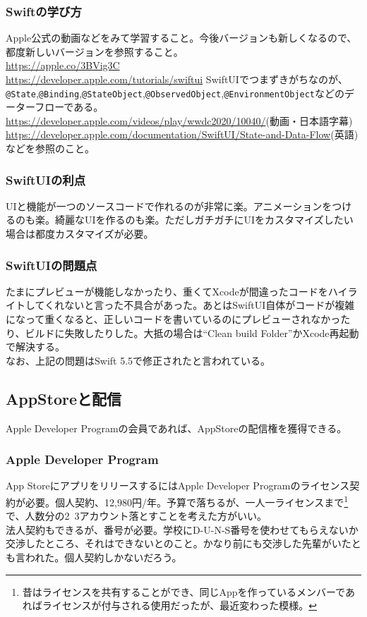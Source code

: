 \documentclass[dvipdfmx,jb5]{jreport}
\begin{document}
\subsubsection{Swiftの学び方}
Apple公式の動画などをみて学習すること。今後バージョンも新しくなるので、都度新しいバージョンを参照すること。\\
\url{https://apple.co/3BVig3C}\\
\url{https://developer.apple.com/tutorials/swiftui}
SwiftUIでつまずきがちなのが、\\
\verb|@State|,\verb|@Binding|,\verb|@StateObject|,\verb|@ObservedObject|,\verb|@EnvironmentObject|などのデーターフローである。\\
\url{https://developer.apple.com/videos/play/wwdc2020/10040/}(動画・日本語字幕)\\
\url{https://developer.apple.com/documentation/SwiftUI/State-and-Data-Flow}(英語)\\
などを参照のこと。
\subsubsection{SwiftUIの利点}
UIと機能が一つのソースコードで作れるのが非常に楽。アニメーションをつけるのも楽。綺麗なUIを作るのも楽。ただしガチガチにUIをカスタマイズしたい場合は都度カスタマイズが必要。
\subsubsection{SwiftUIの問題点}
たまにプレビューが機能しなかったり、重くてXcodeが間違ったコードをハイライトしてくれないと言った不具合があった。あとはSwiftUI自体がコードが複雑になって重くなると、正しいコードを書いているのにプレビューされなかったり、ビルドに失敗したりした。大抵の場合は``Clean build Folder''かXcode再起動で解決する。\\
なお、上記の問題はSwift 5.5で修正されたと言われている。
\subsection{AppStoreと配信}
Apple Developer Programの会員であれば、AppStoreの配信権を獲得できる。
\subsubsection{Apple Developer Program}
App StoreにアプリをリリースするにはApple Developer Programのライセンス契約が必要。個人契約、12,980円/年。予算で落ちるが、一人一ライセンスまで\footnote{昔はライセンスを共有することができ、同じAppを作っているメンバーであればライセンスが付与される使用だったが、最近変わった模様。}で、人数分の2~3アカウント落とすことを考えた方がいい。\\
法人契約もできるが、番号が必要。学校にD-U-N-S番号を使わせてもらえないか交渉したところ、それはできないとのこと。かなり前にも交渉した先輩がいたとも言われた。個人契約しかないだろう。
\end{document}
